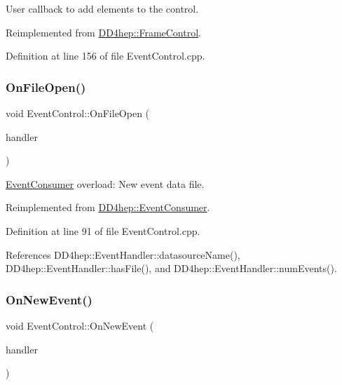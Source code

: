 User callback to add elements to the control. 



Reimplemented from \hyperlink{class_d_d4hep_1_1_frame_control_a934ef76420162167364133e43c7be8b5}{D\+D4hep\+::\+Frame\+Control}.



Definition at line 156 of file Event\+Control.\+cpp.

\hypertarget{class_d_d4hep_1_1_event_control_a651a44af5e16dd7c9f98e3ccec5971a2}{}\label{class_d_d4hep_1_1_event_control_a651a44af5e16dd7c9f98e3ccec5971a2} 
\subsubsection{\texorpdfstring{On\+File\+Open()}{OnFileOpen()}}
{\footnotesize\ttfamily void Event\+Control\+::\+On\+File\+Open (\begin{DoxyParamCaption}\item[{\hyperlink{class_d_d4hep_1_1_event_handler}{Event\+Handler} $\ast$}]{handler }\end{DoxyParamCaption})\hspace{0.3cm}{\ttfamily [virtual]}}



\hyperlink{class_d_d4hep_1_1_event_consumer}{Event\+Consumer} overload\+: New event data file. 



Reimplemented from \hyperlink{class_d_d4hep_1_1_event_consumer_a0a1c56dd7a70e28812fb68c9144ef2fa}{D\+D4hep\+::\+Event\+Consumer}.



Definition at line 91 of file Event\+Control.\+cpp.



References D\+D4hep\+::\+Event\+Handler\+::datasource\+Name(), D\+D4hep\+::\+Event\+Handler\+::has\+File(), and D\+D4hep\+::\+Event\+Handler\+::num\+Events().

\hypertarget{class_d_d4hep_1_1_event_control_af3644b3a91372e313440eaca8cf893c2}{}\label{class_d_d4hep_1_1_event_control_af3644b3a91372e313440eaca8cf893c2} 
\subsubsection{\texorpdfstring{On\+New\+Event()}{OnNewEvent()}}
{\footnotesize\ttfamily void Event\+Control\+::\+On\+New\+Event (\begin{DoxyParamCaption}\item[{\hyperlink{class_d_d4hep_1_1_event_handler}{Event\+Handler} $\ast$}]{handler }\end{DoxyParamCaption})\hspace{0.3cm}{\ttfamily [virtual]}}



